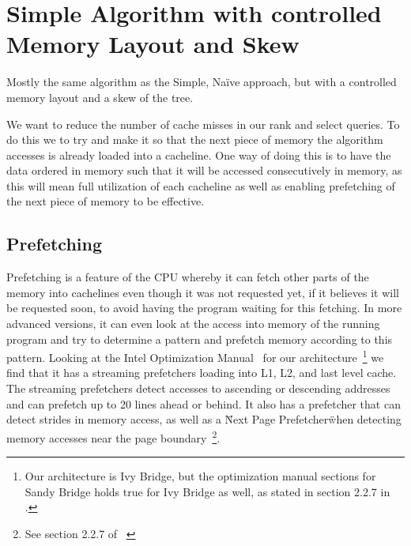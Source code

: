 \section{Simple Algorithm with controlled Memory Layout and Skew}
\label{sec:memorylayout}
Mostly the same algorithm as the Simple, Naïve approach, but with a controlled memory layout and a skew of the tree.

We want to reduce the number of cache misses in our rank and select queries. To do this we to try and make it so that the next piece of memory the algorithm accesses is already loaded into a cacheline. One way of doing this is to have the data ordered in memory such that it will be accessed consecutively in memory, as this will mean full utilization of each cacheline as well as enabling prefetching of the next piece of memory to be effective.

\subsection{Prefetching}
Prefetching is a feature of the CPU whereby it can fetch other parts of the memory into cachelines even though it was not requested yet, if it believes it will be requested soon, to avoid having the program waiting for this fetching.
In more advanced versions, it can even look at the access into memory of the running program and try to determine a pattern and prefetch memory according to this pattern.
Looking at the Intel Optimization Manual~\cite{intel-optimization-manual} for our architecture~\footnote{Our architecture is Ivy Bridge, but the optimization manual sections for Sandy Bridge holds true for Ivy Bridge as well, as stated in section 2.2.7 in \cite{intel-optimization-manual}.} we find that it has a streaming prefetchers loading into L1, L2, and last level cache. The streaming prefetchers detect accesses to ascending or descending addresses and can prefetch up to 20 lines ahead or behind. It also has a prefetcher that can detect strides in memory access, as well as a \"Next Page Prefetcher\" when detecting memory accesses near the page boundary~\footnote{See section 2.2.7 of ~\cite{intel-optimization-manual}}.


